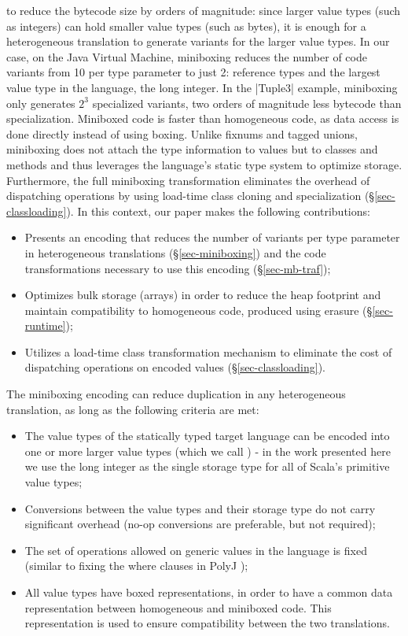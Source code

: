  to reduce the bytecode size by orders of magnitude: since larger value types (such as integers) can hold smaller value types (such as bytes), it is enough for a heterogeneous translation to generate variants for the larger value types. In our case, on the Java Virtual Machine, miniboxing reduces the number of code variants from 10 per type parameter to just 2: reference types and the largest value type in the language, the long integer. In the |Tuple3| example, miniboxing only generates $2^3$ specialized variants, two orders of magnitude less bytecode than specialization. Miniboxed code is faster than homogeneous code, as data access is done directly instead of using boxing. Unlike fixnums and tagged unions, miniboxing does not attach the type information to values but to classes and methods and thus leverages the language's static type system to optimize storage. Furthermore, the full miniboxing transformation eliminates the overhead of dispatching operations by using load-time class cloning and specialization (\S\ref{sec-classloading}). In this context, our paper makes the following contributions:  

\begin{itemize}
  \item Presents an encoding that reduces the number of variants per type parameter in heterogeneous translations (\S{}\ref{sec-miniboxing}) and the code transformations necessary to use this encoding (\S\ref{sec-mb-traf});
  \item Optimizes bulk storage (arrays) in order to reduce the heap footprint and maintain compatibility to homogeneous code, produced using erasure (\S{}\ref{sec-runtime});
  \item Utilizes a load-time class transformation mechanism to eliminate the cost of dispatching operations on encoded values (\S{}\ref{sec-classloading}).
\end{itemize}  

The miniboxing encoding can reduce duplication in any heterogeneous translation, as long as the following criteria are met:
\begin{itemize}
  \item The value types of the statically typed target language can be encoded into one or more larger value types (which we call ) - in the work presented here we use the long integer as the single storage type for all of Scala's primitive value types;
  \item Conversions between the value types and their storage type do not carry significant overhead (no-op conversions are preferable, but not required);
  \item The set of operations allowed on generic values in the language is fixed (similar to fixing the where clauses in PolyJ \cite{myers-polyj});
  \item All value types have boxed representations, in order to have a common data representation between homogeneous and miniboxed code. This representation is used to ensure compatibility between the two translations.
\end{itemize}

